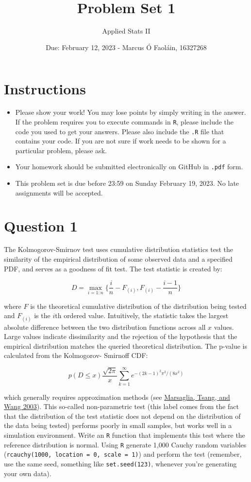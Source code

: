 \documentclass[12pt,letterpaper]{article}
\title{Problem Set 1}
\date{Due: February 12, 2023 - Marcus Ó Faoláin, 16327268}
\author{Applied Stats II}
\begin{document}
	\maketitle
	\section*{Instructions}
	\begin{itemize}
	\item Please show your work! You may lose points by simply writing in the answer. If the problem requires you to execute commands in \texttt{R}, please include the code you used to get your answers. Please also include the \texttt{.R} file that contains your code. If you are not sure if work needs to be shown for a particular problem, please ask.
\item Your homework should be submitted electronically on GitHub in \texttt{.pdf} form.
\item This problem set is due before 23:59 on Sunday February 19, 2023. No late assignments will be accepted.
	\end{itemize}

	\vspace{.25cm}
\section*{Question 1} 
\vspace{.25cm}
\noindent The Kolmogorov-Smirnov test uses cumulative distribution statistics test the similarity of the empirical distribution of some observed data and a specified PDF, and serves as a goodness of fit test. The test statistic is created by:

$$D = \max_{i=1:n} \Big\{ \frac{i}{n}  - F_{(i)}, F_{(i)} - \frac{i-1}{n} \Big\}$$

\noindent where $F$ is the theoretical cumulative distribution of the distribution being tested and $F_{(i)}$ is the $i$th ordered value. Intuitively, the statistic takes the largest absolute difference between the two distribution functions across all $x$ values. Large values indicate dissimilarity and the rejection of the hypothesis that the empirical distribution matches the queried theoretical distribution. The p-value is calculated from the Kolmogorov-
Smirnoff CDF:

$$p(D \leq x) \frac{\sqrt {2\pi}}{x} \sum _{k=1}^{\infty }e^{-(2k-1)^{2}\pi ^{2}/(8x^{2})}$$


\noindent which generally requires approximation methods (see \href{https://core.ac.uk/download/pdf/25787785.pdf}{Marsaglia, Tsang, and Wang 2003}). This so-called non-parametric test (this label comes from the fact that the distribution of the test statistic does not depend on the distribution of the data being tested) performs poorly in small samples, but works well in a simulation environment. Write an \texttt{R} function that implements this test where the reference distribution is normal. Using \texttt{R} generate 1,000 Cauchy random variables (\texttt{rcauchy(1000, location = 0, scale = 1)}) and perform the test (remember, use the same seed, something like \texttt{set.seed(123)}, whenever you're generating your own data).\\
	
\end{document}

